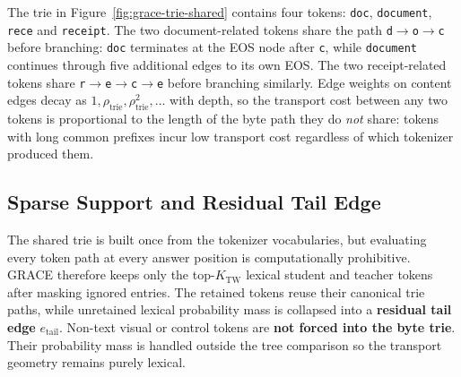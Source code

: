 The trie in Figure~\ref{fig:grace-trie-shared} contains four tokens:
\texttt{doc}, \texttt{document}, \texttt{rece} and \texttt{receipt}.
The two document-related tokens share the path \texttt{d}$\to$\texttt{o}$\to$\texttt{c}
before branching: \texttt{doc} terminates at the EOS node after \texttt{c},
while \texttt{document} continues through five additional edges to its own
EOS. The two receipt-related tokens share \texttt{r}$\to$\texttt{e}$\to$\texttt{c}$\to$\texttt{e}
before branching similarly. Edge weights on content edges decay as
\(1,\rho_{\mathrm{trie}},\rho_{\mathrm{trie}}^2,\ldots\) with depth, so
the transport cost between any two tokens is proportional to the length of
the byte path they do \emph{not} share: tokens with long common prefixes
incur low transport cost regardless of which tokenizer produced them.

\subsection{Sparse Support and Residual Tail Edge}

The shared trie is built once from the tokenizer vocabularies, but evaluating
every token path at every answer position is computationally prohibitive.
GRACE therefore keeps only the top-\(K_{\mathrm{TW}}\) lexical student and
teacher tokens after masking ignored entries. The retained tokens reuse their
canonical trie paths, while unretained lexical probability mass is collapsed
into a \textbf{residual tail edge} \(e_{\mathrm{tail}}\). Non-text visual or control
tokens are \textbf{not forced into the byte trie}. Their probability mass is handled
outside the tree comparison so the transport geometry remains purely lexical.

